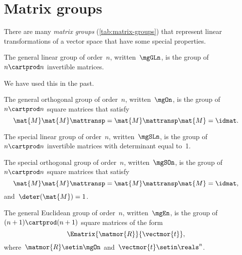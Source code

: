 \section{Matrix groups}


There are many \emph{matrix groups} (\cref{tab:matrix-groups}) that represent linear transformations of a vector space that have some special properties.

\begin{definition}
    \label{def:general-linear-group}
    The general linear group of order~$n$, written~$\mgGLn$, is the group of $n\cartprod n$ invertible matrices.
\end{definition}

We have used this in the past.

\begin{definition}
    \label{def:general-orthogonal-group}
    The general orthogonal group of order~$n$, written~$\mgOn$, is the group of~$n\cartprod n$ square matrices that satisfy
    \begin{equation}
        \mat{M} \mat{M}\mattransp = \mat{M}\mattransp \mat{M} = \idmat.
    \end{equation}
\end{definition}

\begin{definition}
    \label{def:special-linear-group}
    The special linear group of order~$n$, written~$\mgSLn$, is the group of~$n\cartprod n$ invertible matrices with determinant equal to~1.
\end{definition}
\begin{definition}
    \label{def:special-orthogonal-group}
    The special orthogonal group of order~$n$, written~$\mgSOn$, is the group of~$n\cartprod n$ square matrices that satisfy
    \begin{equation}
        \mat{M} \mat{M}\mattransp = \mat{M}\mattransp \mat{M} = \idmat,
    \end{equation}
    and~$\deter(\mat{M}) = 1$.
\end{definition}

\begin{definition}
    \label{def:general-euclidean-group}
    The general Euclidean group of order~$n$, written~$\mgEn$, is the group of~$(n+1)\cartprod (n+1)$ square matrices of the form
    \begin{equation}
        \label{eq:En-def}
        \Ematrix{\matmor{R}}{\vectmor{t}},
    \end{equation}
    where~$\matmor{R}\setin \mgOn$ and~$\vectmor{t} \setin \reals^n$.
\end{definition}

